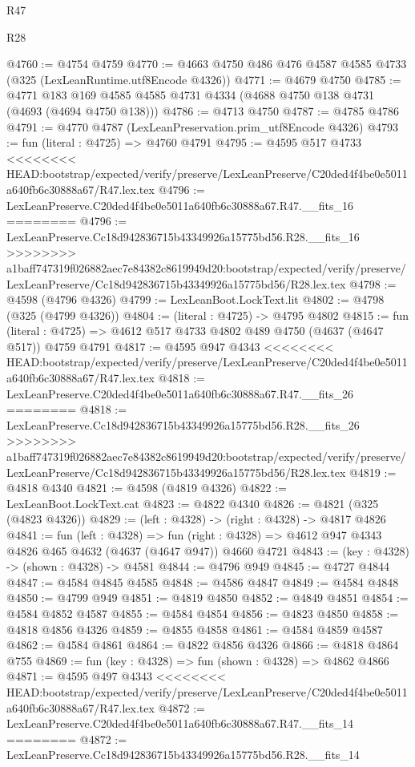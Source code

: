 \begin{lexlean}{R47}
\begin{lexlean}{R28}
\begin{coremodule}
{{{{{{{{{{{{{{{{{{{{{{{{{{{{{{{{{{{{{{{{{{{{{{{{{{{{{{{{{{{{{{{{{{{{{{{{{{{{{{{{{{{{{{{{{{{{{{{{{{{{{{{{{{{{{{{{{{{{{{{{{{{{{{{{{{{{{@4760 := @4754 @4759
@4770 := @4663 @4750 @486 @476 @4587 @4585 @4733 (@325 (LexLeanRuntime.utf8Encode @4326))
@4771 := @4679 @4750
@4785 := @4771 @183 @169 @4585 @4585 @4731 @4334 (@4688 @4750 @138 @4731 (@4693 (@4694 @4750 @138)))
@4786 := @4713 @4750
@4787 := @4785 @4786
@4791 := @4770 @4787 (LexLeanPreservation.prim_utf8Encode @4326)
@4793 := fun (literal : @4725) => @4760 @4791
@4795 := @4595 @517 @4733
<<<<<<<< HEAD:bootstrap/expected/verify/preserve/LexLeanPreserve/C20ded4f4be0e5011a640fb6c30888a67/R47.lex.tex
@4796 := LexLeanPreserve.C20ded4f4be0e5011a640fb6c30888a67.R47.__fits_16
========
@4796 := LexLeanPreserve.Cc18d942836715b43349926a15775bd56.R28.__fits_16
>>>>>>>> a1baff747319f026882aec7e84382c8619949d20:bootstrap/expected/verify/preserve/LexLeanPreserve/Cc18d942836715b43349926a15775bd56/R28.lex.tex
@4798 := @4598 (@4796 @4326)
@4799 := LexLeanBoot.LockText.lit
@4802 := @4798 (@325 (@4799 @4326))
@4804 := (literal : @4725) -> @4795 @4802
@4815 := fun (literal : @4725) => @4612 @517 @4733 @4802 @489 @4750 (@4637 (@4647 @517)) @4759 @4791
@4817 := @4595 @947 @4343
<<<<<<<< HEAD:bootstrap/expected/verify/preserve/LexLeanPreserve/C20ded4f4be0e5011a640fb6c30888a67/R47.lex.tex
@4818 := LexLeanPreserve.C20ded4f4be0e5011a640fb6c30888a67.R47.__fits_26
========
@4818 := LexLeanPreserve.Cc18d942836715b43349926a15775bd56.R28.__fits_26
>>>>>>>> a1baff747319f026882aec7e84382c8619949d20:bootstrap/expected/verify/preserve/LexLeanPreserve/Cc18d942836715b43349926a15775bd56/R28.lex.tex
@4819 := @4818 @4340
@4821 := @4598 (@4819 @4326)
@4822 := LexLeanBoot.LockText.cat
@4823 := @4822 @4340
@4826 := @4821 (@325 (@4823 @4326))
@4829 := (left : @4328) -> (right : @4328) -> @4817 @4826
@4841 := fun (left : @4328) =>
  fun (right : @4328) => @4612 @947 @4343 @4826 @465 @4632 (@4637 (@4647 @947)) @4660 @4721
@4843 := (key : @4328) -> (shown : @4328) -> @4581
@4844 := @4796 @949
@4845 := @4727 @4844
@4847 := @4584 @4845 @4585
@4848 := @4586 @4847
@4849 := @4584 @4848
@4850 := @4799 @949
@4851 := @4819 @4850
@4852 := @4849 @4851
@4854 := @4584 @4852 @4587
@4855 := @4584 @4854
@4856 := @4823 @4850
@4858 := @4818 @4856 @4326
@4859 := @4855 @4858
@4861 := @4584 @4859 @4587
@4862 := @4584 @4861
@4864 := @4822 @4856 @4326
@4866 := @4818 @4864 @755
@4869 := fun (key : @4328) => fun (shown : @4328) => @4862 @4866
@4871 := @4595 @497 @4343
<<<<<<<< HEAD:bootstrap/expected/verify/preserve/LexLeanPreserve/C20ded4f4be0e5011a640fb6c30888a67/R47.lex.tex
@4872 := LexLeanPreserve.C20ded4f4be0e5011a640fb6c30888a67.R47.__fits_14
========
@4872 := LexLeanPreserve.Cc18d942836715b43349926a15775bd56.R28.__fits_14
}}}}}}}}}}}}}}}}}}}}}}}}}}}}}}}}}}}}}}}}}}}}}}}}}}}}}}}}}}}}}}}}}}}}}}}}}}}}}}}}}}}}}}}}}}}}}}}}}}}}}}}}}}}}}}}}}}}}}}}}}}}}}}}}}}}}}
\end{coremodule}
\end{lexlean}
\end{lexlean}
